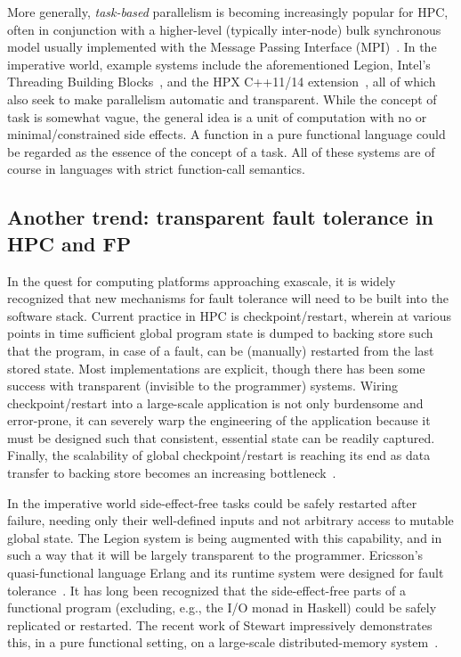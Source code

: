 \documentclass{llncs}
\begin{document}
More generally, \emph{task-based} parallelism is becoming increasingly popular
for HPC, often in conjunction with a higher-level (typically inter-node) bulk
synchronous model usually implemented with the Message Passing Interface
(MPI)~\cite{MPI}\@.  In the imperative world, example systems include the
aforementioned Legion, Intel's Threading Building Blocks~\cite{Reinders:2007},
and the HPX C++11/14 extension~\cite{HPX}, all of which also seek to
make parallelism automatic and transparent.  While the concept of task is
somewhat vague, the general idea is a unit of computation with no or
minimal/constrained side effects.  A function in a pure functional language
could be regarded as the essence of the concept of a task.  All of these
systems are of course in languages with strict function-call semantics.

\subsection{Another trend: transparent fault tolerance in HPC and FP}
In the quest for computing platforms approaching exascale, it is widely
recognized that new mechanisms for fault tolerance will need to be built into
the software stack.  Current practice in HPC is checkpoint/restart, wherein at
various points in time sufficient global program state is dumped to backing store
such that the program, in case of a fault, can be (manually) restarted from
the last stored state.  Most implementations are explicit, though there has
been some success with transparent (invisible to the programmer) systems.
Wiring checkpoint/restart into a large-scale application is not only
burdensome and error-prone, it can severely warp the engineering of the
application because it must be designed such that consistent, essential state
can be readily captured.  Finally, the scalability of global
checkpoint/restart is reaching its end as data transfer to backing store
becomes an increasing bottleneck~\cite{Daly:2006,DOE:2009}.

In the imperative world side-effect-free tasks could be safely restarted after
failure, needing only their well-defined inputs and not arbitrary access to
mutable global state.  The Legion system is being augmented with this
capability, and in such a way that it will be largely transparent to the
programmer.  Ericsson's quasi-functional language Erlang and its runtime
system were designed for fault tolerance~\cite{Cesarini:2009}.  It has long
been recognized that the side-effect-free parts of a functional program
(excluding, e.g., the I/O monad in Haskell) could be safely replicated or
restarted.  The recent work of Stewart impressively demonstrates this, in a
pure functional setting, on a large-scale distributed-memory
system~\cite{Stewart:2013}.
\end{document}
